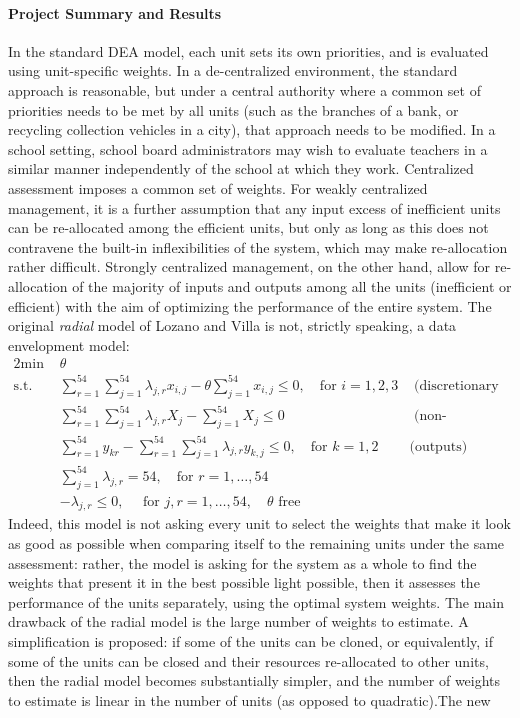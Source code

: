 \paragraph*{Project Summary and Results} In the standard DEA model, each unit sets its own priorities, and is evaluated using unit-specific weights. In a de-centralized environment, the standard approach is reasonable, but under a central authority where a common set of priorities needs to be met by all units (such as the branches of a bank, or recycling collection vehicles in a city), that approach needs to be modified. In a school setting, school board administrators may wish to evaluate teachers in a similar manner independently of the school at which they work.
\newl Centralized assessment imposes a common set of weights. For weakly centralized management, it is a further assumption that any input excess of inefficient units can be re-allocated among the efficient units, but only as long as this does not contravene the built-in inflexibilities of the system, which may make re-allocation rather difficult. Strongly centralized management, on the other hand, allow for re-allocation of the majority of inputs and outputs among all the units (inefficient or efficient) with the aim  of optimizing the performance of the entire system.\newl 
The original \textit{radial} model of Lozano and Villa is not, strictly speaking, a data envelopment model:
  \begin{alignat*}{2}
    \text{min }   & \theta & &\  \\
    \text{s.t. } & \sum_{r=1}^{54}\sum_{j=1}^{54} \lambda_{j,r}x_{i,j}-\theta \sum_{j=1}^{54}x_{i,j} \leq 0,  \quad\text{for }i=1,2,3 & \text{ (discretionary inputs)}& \\
    & \sum_{r=1}^{54}\sum_{j=1}^{54} \lambda_{j,r}X_{j}- \sum_{j=1}^{54}X_j \leq 0  &\text{ (non-discretionary input)} & \\
                       & \sum_{r=1}^{54}y_{kr}-\sum_{r=1}^{54}\sum_{j=1}^{54} \lambda_{j,r}y_{k,j}\leq 0, \quad \text{for }k=1,2 & \text{(outputs)}\\
                       & \sum_{j=1}^{54}\lambda_{j,r}=54,\quad \text{for }r=1,\ldots,54 &  &\\
                       & -\lambda_{j,r}\leq 0, \quad\text{ for }j,r=1,\ldots,54, \quad \theta \text{ free} & & 
  \end{alignat*}
Indeed, this model is not asking every unit to select the weights that make it look as good as possible when comparing itself to the remaining units under the same assessment: rather, the model is asking for the system as a whole to find the weights that present it in the best possible light possible, then it assesses the performance of the units separately, using the optimal system weights. \newl The main drawback of the radial model is the large number of weights to estimate. A simplification is proposed: if some of the units can be cloned, or equivalently, if some of the units can be closed and their resources re-allocated to other units, then the radial model becomes substantially simpler, and the number of weights to estimate is linear in the number of units (as opposed to quadratic).\newpage\noindent The new
